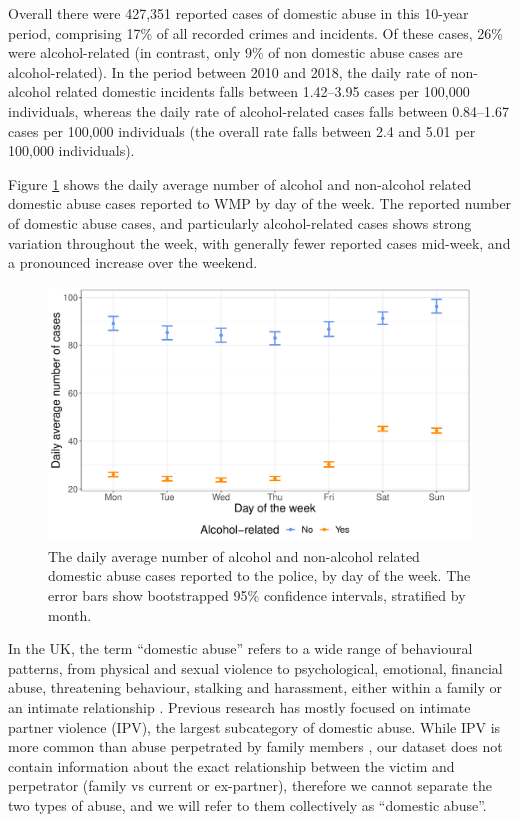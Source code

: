 \documentclass[12pt, a4paper]{article}
\begin{document}
 Overall there were 427,351 reported cases of domestic abuse in this 10-year period, comprising 17\% of all recorded crimes and incidents. Of these cases, 26\% were alcohol-related (in contrast, only 9\% of non domestic abuse cases are alcohol-related). In the period between 2010 and 2018, the daily rate of non-alcohol related domestic incidents falls between 1.42--3.95 cases per 100,000 individuals, whereas the daily rate of alcohol-related cases falls between 0.84--1.67 cases per 100,000 individuals (the overall rate falls between 2.4 and 5.01 per 100,000 individuals). 

Figure \ref{fig:descriptive} shows the daily average number of alcohol and non-alcohol related domestic abuse cases reported to WMP by day of the week. The reported number of domestic abuse cases, and particularly alcohol-related cases shows strong variation throughout the week, with generally fewer reported cases mid-week, and a pronounced increase over the weekend. 

\begin{figure} 
\begin{center} 
\includegraphics[scale = 0.6]{descriptives.pdf}
\caption{The daily average number of alcohol and non-alcohol related domestic abuse cases reported to the police, by day of the week. The error bars show bootstrapped 95\% confidence intervals, stratified by month. \label{fig:descriptive}} 
\end{center} 
\end{figure} 

In the UK, the term ``domestic abuse'' refers to a wide range of behavioural patterns, from physical and sexual violence to psychological, emotional, financial abuse, threatening behaviour, stalking and harassment, either within a family or an intimate relationship \cite{ONS}. Previous research has mostly focused on intimate partner violence (IPV), the largest subcategory of domestic abuse. While IPV is more common than abuse perpetrated by family members \cite{ONS}, our dataset does not contain information about the exact relationship between the victim and perpetrator (family vs current or ex-partner), therefore we cannot separate the two types of abuse, and we will refer to them collectively as ``domestic abuse''.
\end{document}
